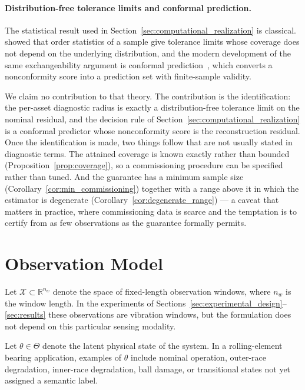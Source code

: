 \documentclass[a4paper]{cas-sc}
\newcommand{\X}{\ensuremath{\mathcal{X}}}
\newcommand{\ThetaSpace}{\ensuremath{\Theta}}
\newcommand{\R}{\ensuremath{\mathbb{R}}}
\begin{document}
\paragraph{Distribution-free tolerance limits and conformal prediction.}
The statistical result used in Section~\ref{sec:computational_realization} is
classical. \citet{wilks1941} showed that order statistics of a sample give
tolerance limits whose coverage does not depend on the underlying
distribution, and the modern development of the same exchangeability argument
is conformal prediction~\citep{vovk2005,shafer2008,papadopoulos2002,lei2018},
which converts a nonconformity score into a prediction set with finite-sample
validity.

We claim no contribution to that theory. The contribution is the
identification: the per-asset diagnostic radius is exactly a distribution-free
tolerance limit on the nominal residual, and the decision rule of
Section~\ref{sec:computational_realization} is a conformal predictor whose
nonconformity score is the reconstruction residual. Once the identification is
made, two things follow that are not usually stated in diagnostic terms. The
attained coverage is known exactly rather than bounded
(Proposition~\ref{prop:coverage}), so a commissioning procedure can be
specified rather than tuned. And the guarantee has a minimum sample size
(Corollary~\ref{cor:min_commissioning}) together with a range above it in
which the estimator is degenerate
(Corollary~\ref{cor:degenerate_range}) --- a caveat that matters in practice,
where commissioning data is scarce and the temptation is to certify from as
few observations as the guarantee formally permits.

\section{Observation Model}
\label{sec:observation_model}

Let \(\X \subset \R^{n_w}\) denote the space of fixed-length observation
windows, where \(n_w\) is the window length. In the experiments of
Sections~\ref{sec:experimental_design}--\ref{sec:results} these observations
are vibration windows, but the formulation does not depend on this
particular sensing modality.

Let \(\theta \in \ThetaSpace\) denote the latent physical state of the
system. In a rolling-element bearing application, examples of \(\theta\)
include nominal operation, outer-race degradation, inner-race degradation,
ball damage, or transitional states not yet assigned a semantic label.
\end{document}
